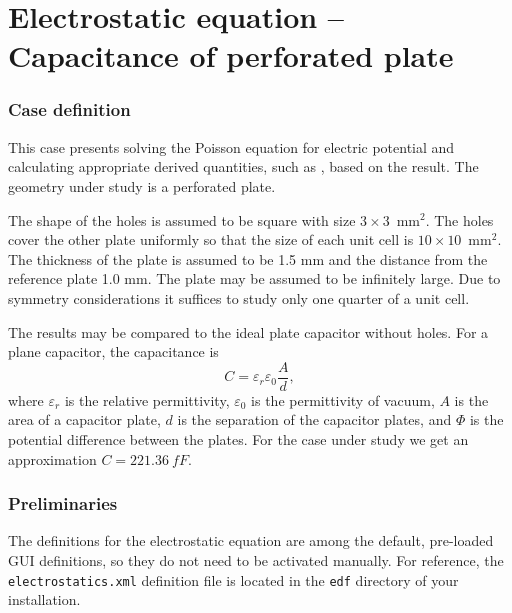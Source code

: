 \chapter{Electrostatic equation -- Capacitance of perforated plate}



\subsection*{Case definition}

This case presents solving the Poisson equation for electric potential
and calculating appropriate derived quantities, such as
, based on the result. 
The geometry under study is a perforated plate.

The shape of the holes is assumed to be square with size $3\times 3$~mm$^2$.
The holes cover the other plate uniformly so that the size of each unit cell is 
$10\times 10$~mm$^2$.
The thickness of the plate is assumed to be 
1.5 mm and the distance from the reference plate 1.0 mm. 
The plate may be assumed to be infinitely large. Due to symmetry considerations it suffices to study
only one quarter of a unit cell.

The results may be compared to the ideal plate capacitor without holes. 
For a plane capacitor, the
capacitance is
\begin{equation}
C=\varepsilon_r\varepsilon_0\frac{A}{d},
\end{equation}
where $\varepsilon_r$ is the relative permittivity, $\varepsilon_0$
is the permittivity of vacuum, $A$ is the area of a capacitor plate,
$d$ is the separation of the capacitor plates, and $\Phi$ is the
potential difference between the plates.
For the case under study we get an approximation $C=221.36~fF$.


\subsection*{Preliminaries}

The definitions for the electrostatic equation are among the default, pre-loaded
GUI definitions, so they do not need to be activated manually. For reference, the
\texttt{electrostatics.xml} definition file is located in the \texttt{edf} directory
of your installation.


